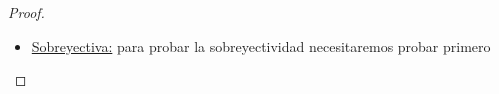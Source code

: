 \documentclass[../VD.tex]{subfiles}
\begin{document}
\begin{proof}
\begin{itemize}
      Sea ahora, \((U,\varphi)\) carta con \(p\in U\) y tal que
      \(U\overset{\varphi}{\to}\varphi(U)\overset{\pi_{j}}{\to}\RealSet\),
      siendo \(\pi_{j}\) la proyección en la coordenada \(j\)
      y sea \(\varphi_{j}=\pi_{j}\circ\varphi\), entonces: 
      \[\begin{array}{c}
        0=\sum\limits_{i=1}^{m}\lambda_{i}\delta_{e_{i}^{p}}(\Clase{\varphi_{j}})= \\
          \sum\limits_{i=1}^{m}\lambda_{i}
          \Restrict{\pderiv{(\varphi_{j}\circ\varphi^{-1})}{x_{i}}}{\varphi(p)}=
          \sum\limits_{i=1}^{m}\lambda_{i}
          \Restrict{\pderiv{\pi_{j}}{x_{i}}}{\varphi(p)} \ (\star)
        \end{array}\]
      y resulta que \(\Restrict{\pderiv{\pi_{j}}{x_{i}}}{\varphi(p)}\) se anula
      si \(j\neq i\) y vale uno cuando son iguales, luego por \((\star)\)
      obtenemos que \(\lambda_{j}=0\) para \(j\) fijo. Si variamos \(j\) veremos
      que \(\lambda_{i}=0\ \forall i\), luego \(\ker{\phi}=\{0\}\). 

      \item \underline{Sobreyectiva:} para probar la sobreyectividad
        necesitaremos probar primero
  \end{itemize}
  
\end{proof}
\end{document}
